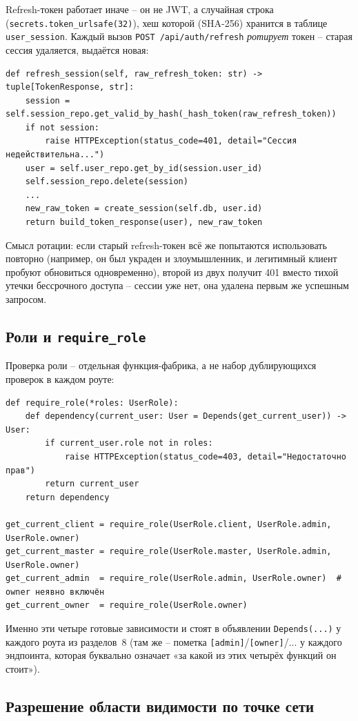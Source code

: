 Refresh-токен работает иначе -- он не JWT, а случайная строка
(\texttt{secrets.token_urlsafe(32)}), хеш которой (SHA-256) хранится в
таблице \texttt{user\_session}. Каждый вызов \texttt{POST /api/auth/refresh}
\emph{ротирует} токен -- старая сессия удаляется, выдаётся новая:
\begin{verbatim}
def refresh_session(self, raw_refresh_token: str) -> tuple[TokenResponse, str]:
    session = self.session_repo.get_valid_by_hash(_hash_token(raw_refresh_token))
    if not session:
        raise HTTPException(status_code=401, detail="Сессия недействительна...")
    user = self.user_repo.get_by_id(session.user_id)
    self.session_repo.delete(session)
    ...
    new_raw_token = create_session(self.db, user.id)
    return build_token_response(user), new_raw_token
\end{verbatim}
Смысл ротации: если старый refresh-токен всё же попытаются использовать
повторно (например, он был украден и злоумышленник, и легитимный клиент
пробуют обновиться одновременно), второй из двух получит 401 вместо
тихой утечки бессрочного доступа -- сессии уже нет, она удалена первым же
успешным запросом.

\subsection{Роли и \texttt{require_role}}

Проверка роли -- отдельная функция-фабрика, а не набор дублирующихся
проверок в каждом роуте:
\begin{verbatim}
def require_role(*roles: UserRole):
    def dependency(current_user: User = Depends(get_current_user)) -> User:
        if current_user.role not in roles:
            raise HTTPException(status_code=403, detail="Недостаточно прав")
        return current_user
    return dependency

get_current_client = require_role(UserRole.client, UserRole.admin, UserRole.owner)
get_current_master = require_role(UserRole.master, UserRole.admin, UserRole.owner)
get_current_admin  = require_role(UserRole.admin, UserRole.owner)  # owner неявно включён
get_current_owner  = require_role(UserRole.owner)
\end{verbatim}
Именно эти четыре готовые зависимости и стоят в объявлении
\texttt{Depends(...)} у каждого роута из разделов~8 (там же -- пометка
\texttt{[admin]}/\texttt{[owner]}/... у каждого эндпоинта, которая
буквально означает «за какой из этих четырёх функций он стоит»).

\subsection{Разрешение области видимости по точке сети}

